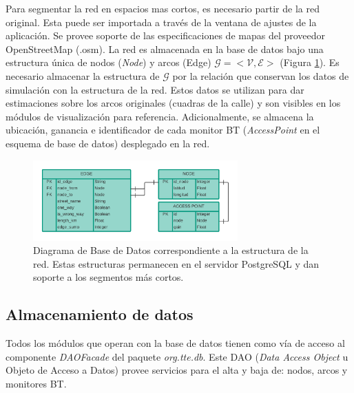  Para segmentar la red en espacios mas cortos, es necesario partir de la red original. Esta puede ser importada a través de la ventana de ajustes de la aplicación. Se provee soporte de las especificaciones de mapas del proveedor OpenStreetMap (.osm). La red es almacenada en la base de datos bajo una estructura única de nodos (\textit{Node}) y arcos ({Edge}) \(\mathcal{G=<V,E>}\) (Figura \ref{fig:bbdd-viterbi}). Es necesario almacenar la estructura de $\mathcal{G}$ por la relación que conservan los datos de simulación con la estructura de la red. Estos datos se utilizan para dar estimaciones sobre los arcos originales (cuadras de la calle) y son visibles en los módulos de visualización para referencia. Adicionalmente, se almacena la ubicación, ganancia e identificador de cada monitor BT (\textit{AccessPoint} en el esquema de base de datos) desplegado en la red.
 
 \begin{figure}[!htp]
	\centering
	\includegraphics[width=0.7\textwidth]{images/bbdd-viterbi.png}
	\captionsetup{width=0.7\textwidth}
	\caption{Diagrama de Base de Datos correspondiente a la estructura de la red. Estas estructuras permanecen en el servidor PostgreSQL y dan soporte a los segmentos más cortos.}
    \label{fig:bbdd-viterbi}
\end{figure}

\subsection{Almacenamiento de datos}

 Todos los módulos que operan con la base de datos tienen como vía de acceso al componente \textit{DAOFacade} del paquete \textit{org.tte.db}. Este DAO (\textit{Data Access Object} u Objeto de Acceso a Datos) provee servicios para el alta y baja de: nodos, arcos y monitores BT. 
 
